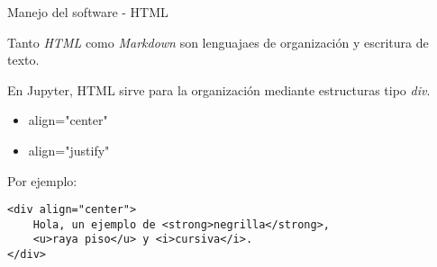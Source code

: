 \begin{frame}[fragile]{Manejo del software - HTML}\vspace{10pt}

Tanto \textit{HTML} como \textit{Markdown} son lenguajaes de organizaci\'on y escritura de texto.

\vspace{5pt}

En Jupyter, HTML sirve para la organizaci\'on mediante estructuras tipo \textit{div}.

\begin{itemize}
	\item align="center"
	\item align="justify"
\end{itemize}

Por ejemplo:

\begin{center}
\begin{lstlisting}
<div align="center">
	Hola, un ejemplo de <strong>negrilla</strong>,
	<u>raya piso</u> y <i>cursiva</i>.
</div>
\end{lstlisting}
\end{center}

\end{frame}